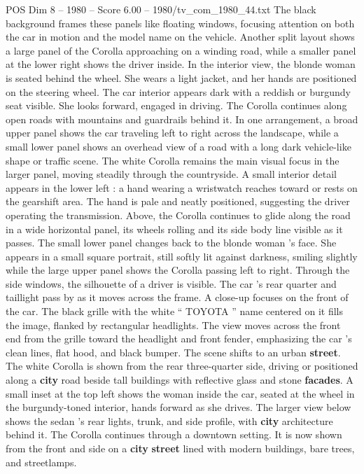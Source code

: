 \begin{textsample}{POS Dim 8 – 1980 – Score 6.00 – 1980/tv\_com\_1980\_44.txt}
The black background frames these panels like floating windows, focusing attention on both the car in motion and the model name on the vehicle.
Another split layout shows a large panel of the Corolla approaching on a winding road, while a smaller panel at the lower right shows the driver inside.
In the interior view, the blonde woman is seated behind the wheel.
She wears a light jacket, and her hands are positioned on the steering wheel.
The car interior appears dark with a reddish or burgundy seat visible.
She looks forward, engaged in driving.
The Corolla continues along open roads with mountains and guardrails behind it.
In one arrangement, a broad upper panel shows the car traveling left to right across the landscape, while a small lower panel shows an overhead view of a road with a long dark vehicle-like shape or traffic scene.
The white Corolla remains the main visual focus in the larger panel, moving steadily through the countryside.
A small interior detail appears in the lower left : a hand wearing a wristwatch reaches toward or rests on the gearshift area.
The hand is pale and neatly positioned, suggesting the driver operating the transmission.
Above, the Corolla continues to glide along the road in a wide horizontal panel, its wheels rolling and its side body line visible as it passes.
The small lower panel changes back to the blonde woman ’s face.
She appears in a small square portrait, still softly lit against darkness, smiling slightly while the large upper panel shows the Corolla passing left to right.
Through the side windows, the silhouette of a driver is visible.
The car ’s rear quarter and taillight pass by as it moves across the frame.
A close-up focuses on the front of the car.
The black grille with the white “ TOYOTA ” name centered on it fills the image, flanked by rectangular headlights.
The view moves across the front end from the grille toward the headlight and front fender, emphasizing the car ’s clean lines, flat hood, and black bumper.
The scene shifts to an urban \textbf{street}.
The white Corolla is shown from the rear three-quarter side, driving or positioned along a \textbf{city} road beside tall buildings with reflective glass and stone \textbf{facades}.
A small inset at the top left shows the woman inside the car, seated at the wheel in the burgundy-toned interior, hands forward as she drives.
The larger view below shows the sedan ’s rear lights, trunk, and side profile, with \textbf{city} architecture behind it.
The Corolla continues through a downtown setting.
It is now shown from the front and side on a \textbf{city} \textbf{street} lined with modern buildings, bare trees, and streetlamps.

\end{textsample}
